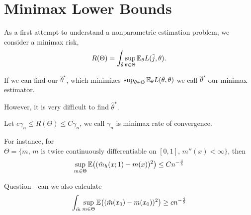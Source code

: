 
\chapter{Minimax Lower Bounds}
\label{cha:minimax-lower-bounds}

As a first attempt to understand a nonparametric estimation problem,
we consider a minimax risk,
\begin{equation}
  \label{eq:105}
  R(\Theta) = \int_{\tilde \theta} \sup_{\theta \in \Theta}
  \E_{\theta} L(\tilde j, \theta).
\end{equation}

If we can find our $\hat \theta^{\star}$, which minimizes
$\sup_{\theta \in \Theta} \E_{\theta} L(\tilde \theta, \theta)$ we
call $\hat \theta^{\star}$ our minimax estimator.

However, it is very difficult to find $\hat \theta^{\star}$.

Let $c \gamma_{n} \leq R(\Theta) \leq C \gamma_{n}$, we call
$\gamma_{n}$ is minimax rate of convergence.

For instance, for $\Theta = \{ \text{$m$, $m$ is twice continuously
  differentiable on $[0, 1]$, $m''(x) < \infty$} \}$, then
\begin{equation}
  \label{eq:106}
  \sup_{m \in \Theta} \E{(\hat m_{h}(x; 1) - m(x))^{2}} \leq C n^{-\frac{4}{5}}
\end{equation}

Question - can we also calculate
\begin{equation}
  \label{eq:107}
  \int_{\tilde m} \sup_{m \in \Theta} \E{(\tilde m(x_{0}) - m(x_{0}))^{2}} \geq cn^{-\frac{4}{5}}
\end{equation}

